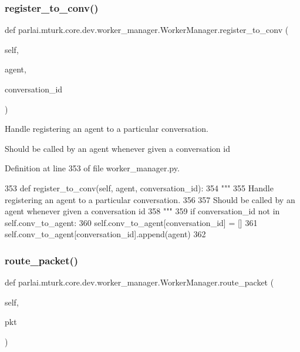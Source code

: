 \subsubsection{\texorpdfstring{register\+\_\+to\+\_\+conv()}{register\_to\_conv()}}
{\footnotesize\ttfamily def parlai.\+mturk.\+core.\+dev.\+worker\+\_\+manager.\+Worker\+Manager.\+register\+\_\+to\+\_\+conv (\begin{DoxyParamCaption}\item[{}]{self,  }\item[{}]{agent,  }\item[{}]{conversation\+\_\+id }\end{DoxyParamCaption})}

\begin{DoxyVerb}Handle registering an agent to a particular conversation.

Should be called by an agent whenever given a conversation id
\end{DoxyVerb}
 

Definition at line 353 of file worker\+\_\+manager.\+py.


\begin{DoxyCode}
353     \textcolor{keyword}{def }register\_to\_conv(self, agent, conversation\_id):
354         \textcolor{stringliteral}{"""}
355 \textcolor{stringliteral}{        Handle registering an agent to a particular conversation.}
356 \textcolor{stringliteral}{}
357 \textcolor{stringliteral}{        Should be called by an agent whenever given a conversation id}
358 \textcolor{stringliteral}{        """}
359         \textcolor{keywordflow}{if} conversation\_id \textcolor{keywordflow}{not} \textcolor{keywordflow}{in} self.conv\_to\_agent:
360             self.conv\_to\_agent[conversation\_id] = []
361         self.conv\_to\_agent[conversation\_id].append(agent)
362 
\end{DoxyCode}
\mbox{\label{classparlai_1_1mturk_1_1core_1_1dev_1_1worker__manager_1_1WorkerManager_a64541274656cb7cc6890da1625c0bb2b}} 
\subsubsection{\texorpdfstring{route\+\_\+packet()}{route\_packet()}}
{\footnotesize\ttfamily def parlai.\+mturk.\+core.\+dev.\+worker\+\_\+manager.\+Worker\+Manager.\+route\+\_\+packet (\begin{DoxyParamCaption}\item[{}]{self,  }\item[{}]{pkt }\end{DoxyParamCaption})}


